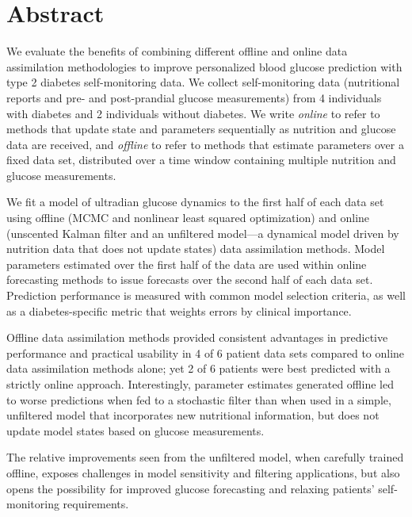 \documentclass[10pt,letterpaper]{article}
\begin{document}
\section{Abstract}
We evaluate the benefits of combining different offline and online data assimilation methodologies to improve personalized blood glucose prediction with type 2 diabetes self-monitoring data.
We collect self-monitoring data (nutritional reports and pre- and post-prandial glucose measurements) from 4 individuals with diabetes and 2 individuals without diabetes.
We write \emph{online} to refer to methods that update state and parameters sequentially as nutrition and glucose data are received, and \emph{offline} to refer to methods that estimate parameters over a fixed data set, distributed over a time window containing multiple nutrition and glucose measurements.

We fit a model of ultradian glucose dynamics to the first half of each data set using offline (MCMC and nonlinear least squared optimization) and online (unscented Kalman filter and an unfiltered model---a dynamical model driven by nutrition data that does not update states) data assimilation methods. 
Model parameters estimated over the first half of the data are used within online forecasting methods to issue forecasts over the second half of each data set. Prediction performance is measured with common model selection criteria, as well as a diabetes-specific metric that weights errors by clinical importance.

Offline data assimilation methods provided consistent advantages in predictive performance and practical usability in 4 of 6 patient data sets compared to online data assimilation methods alone; yet 2 of 6 patients were best predicted with a strictly online approach.
Interestingly, parameter estimates generated offline led to worse predictions when fed to a stochastic filter than when used in a simple, unfiltered model that incorporates new nutritional information, but does not update model states based on glucose measurements.

The relative improvements seen from the unfiltered model, when carefully trained offline, exposes challenges in model sensitivity and filtering applications, but also opens the possibility for improved glucose forecasting and relaxing patients' self-monitoring requirements.

\end{document}
